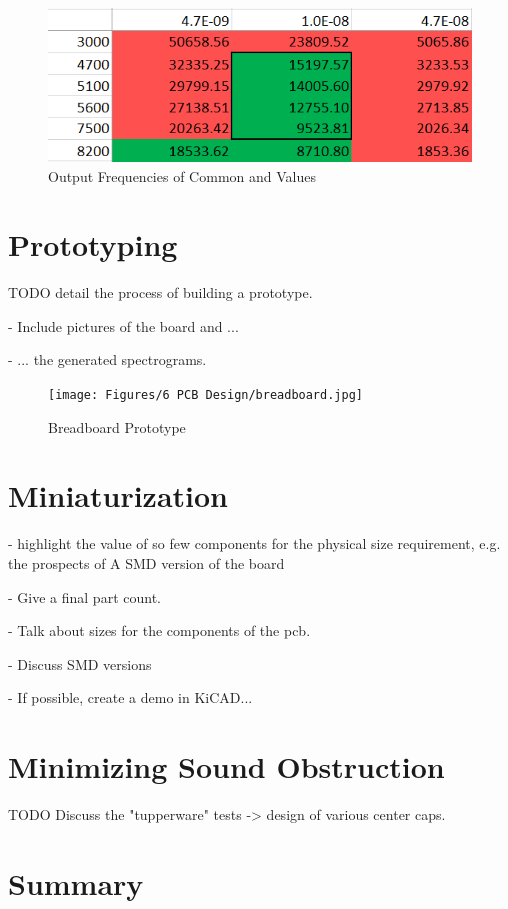 \begin{figure}[h]
    \centering
    \caption{Output Frequencies of Common  and  Values}
    \label{fig:freq-selection-r}
    \includegraphics[width=0.8\linewidth]{Figures/6 PCB Design/freq_selection_r.png}
\end{figure}


\newpage
\section{Prototyping}
\label{sec:prototype}

TODO detail the process of building a prototype.

- Include pictures of the board and ...

- ... the generated spectrograms.

\begin{figure}[h]
    \centering
    \caption{Breadboard Prototype}
    \label{fig:breadboard}
    \texttt{[image: Figures/6 PCB Design/breadboard.jpg]}
\end{figure}

\section{Miniaturization}
- highlight the value of so few components for the physical size requirement, e.g. the prospects of A SMD version of the board

- Give a final part count.

- Talk about sizes for the components of the pcb.

- Discuss SMD versions

- If possible, create a demo in KiCAD...

\section{Minimizing Sound Obstruction}
TODO Discuss the "tupperware" tests -> design of various center caps.

\section{Summary}
